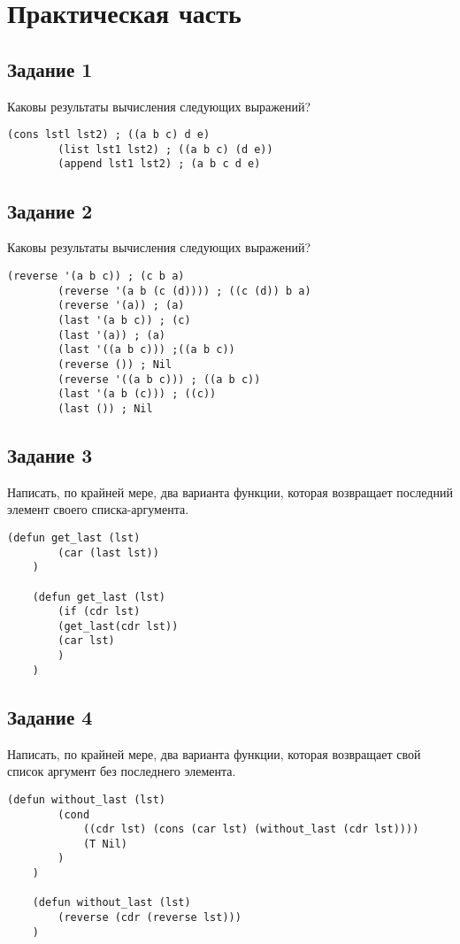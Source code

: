 \chapter{Практическая часть}
\section{Задание 1}
Каковы результаты вычисления следующих выражений?
\begin{center}	
	\begin{lstlisting}[label=a, caption={Выражение 1}]
		(cons lstl lst2) ; ((a b c) d e)
		(list lst1 lst2) ; ((a b c) (d e))
		(append lst1 lst2) ; (a b c d e)
	\end{lstlisting}
\end{center}

\section{Задание 2}
Каковы результаты вычисления следующих выражений?
\begin{center}	
	\begin{lstlisting}[label=b, caption={Выражение 2}]
		(reverse '(a b c)) ; (c b a)
		(reverse '(a b (c (d)))) ; ((c (d)) b a)
		(reverse '(a)) ; (a)
		(last '(a b c)) ; (c)
		(last '(a)) ; (a)
		(last '((a b c))) ;((a b c))
		(reverse ()) ; Nil
		(reverse '((a b c))) ; ((a b c))
		(last '(a b (c))) ; ((c))
		(last ()) ; Nil
	\end{lstlisting}
\end{center}

\section{Задание 3}
Написать, по крайней мере, два варианта функции, которая возвращает
последний элемент своего списка-аргумента. 
\begin{center}	
	\begin{lstlisting}[label=c, caption={Выражение 3}]
	(defun get_last (lst)
		(car (last lst))
	)
	
	(defun get_last (lst)
		(if (cdr lst)
		(get_last(cdr lst))
		(car lst)
		)
	)
	\end{lstlisting}
\end{center}


\section{Задание 4}
Написать, по крайней мере, два варианта функции, которая возвращает
свой список аргумент без последнего элемента. 
\begin{center}	
	\begin{lstlisting}[label=d, caption={Выражение 4}]
	(defun without_last (lst)
		(cond
			((cdr lst) (cons (car lst) (without_last (cdr lst))))
			(T Nil)
		)
	)
	
	(defun without_last (lst)
		(reverse (cdr (reverse lst)))
	)
	
	\end{lstlisting}
\end{center}

